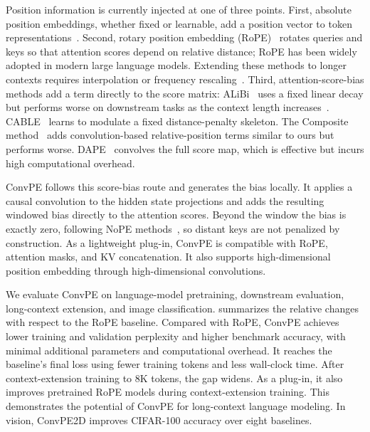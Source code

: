 \documentclass{article}
\begin{document}
Position information is currently injected at one of three points. First, absolute position embeddings, whether fixed or learnable, add a position vector to token representations~\cite{vaswani2017attention,devlin2019bert,radford2019language}. Second, rotary position embedding (RoPE)~\cite{su2021roformer} rotates queries and keys so that attention scores depend on relative distance; RoPE has been widely adopted in modern large language models. Extending these methods to longer contexts requires interpolation or frequency rescaling~\cite{peng2024yarn}. Third, attention-score-bias methods add a term directly to the score matrix: ALiBi~\cite{press2021train} uses a fixed linear decay but performs worse on downstream tasks as the context length increases~\cite{kazemnejad2023impact}. CABLE~\cite{veisi2025cable} learns to modulate a fixed distance-penalty skeleton. The Composite method~\cite{chang2021convolutionsselfattentionreinterpretingrelative} adds convolution-based relative-position terms similar to ours but performs worse. DAPE~\cite{zheng2025dapev2} convolves the full score map, which is effective but incurs high computational overhead.

ConvPE follows this score-bias route and generates the bias locally. It applies a causal convolution to the hidden state projections and adds the resulting windowed bias directly to the attention scores. Beyond the window the bias is exactly zero, following NoPE methods~\cite{kazemnejad2023impact}, so distant keys are not penalized by construction. As a lightweight plug-in, ConvPE is compatible with RoPE, attention masks, and KV concatenation. It also supports high-dimensional position embedding through high-dimensional convolutions.

We evaluate ConvPE on language-model pretraining, downstream evaluation, long-context extension, and image classification.  summarizes the relative changes with respect to the RoPE baseline. Compared with RoPE, ConvPE achieves lower training and validation perplexity and higher benchmark accuracy, with minimal additional parameters and computational overhead. It reaches the baseline's final loss using fewer training tokens and less wall-clock time. After context-extension training to 8K tokens, the gap widens. As a plug-in, it also improves pretrained RoPE models during context-extension training. This demonstrates the potential of ConvPE for long-context language modeling. In vision, ConvPE2D improves CIFAR-100 accuracy over eight baselines.
\end{document}
